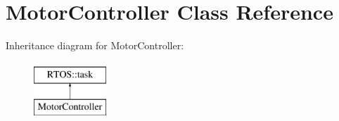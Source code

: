 \hypertarget{class_motor_controller}{}\section{Motor\+Controller Class Reference}
\label{class_motor_controller}
Inheritance diagram for Motor\+Controller\+:\begin{figure}[H]
\begin{center}
\leavevmode
\includegraphics[height=2.000000cm]{class_motor_controller}
\end{center}
\end{figure}
